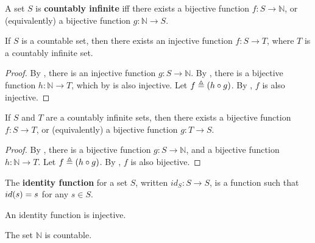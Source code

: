 \begin{definition} \label{def:countably-infinite} A set $S$ is
\textbf{countably infinite} iff there exists a bijective function $f : S
\rightarrow \mathbb{N}$, or (equivalently) a bijective function $g : \mathbb{N}
\rightarrow S$. \end{definition}

\begin{theorem} \label{thm:countable-to-countably-infinite} If $S$ is a
countable set, then there exists an injective function $f : S \rightarrow T$,
where $T$ is a countably infinite set.  \end{theorem}

\begin{proof} By , there is an injective function $g : S
\rightarrow \mathbb{N}$. By , there is a bijective
function $h : \mathbb{N} \rightarrow T$, which by  is also
injective. Let $f \triangleq {\ensuremath{\mathopen{}\left({h \circ g}\right)\mathclose{}}}$. By , $f$
is also injective. \end{proof}

\begin{theorem} \label{thm:countably-infinite-to-countably-infinite} If $S$ and
$T$ are a countably infinite sets, then there exists a bijective function $f :
S \rightarrow T$, or (equivalently) a bijective function $g : T \rightarrow S$.
\end{theorem}

\begin{proof} By , there is a bijective function $g
: S \rightarrow \mathbb{N}$, and a bijective function $h : \mathbb{N}
\rightarrow T$. Let $f \triangleq {\ensuremath{\mathopen{}\left({h \circ g}\right)\mathclose{}}}$. By
, $f$ is also bijective.\end{proof}

\begin{definition} \label{def:id-function} The \textbf{identity function} for a
set $S$, written $id_S : S\rightarrow S$, is a function such that $id{\mathopen{}\left({s}\right)\mathclose{}}=s$
for any $s\in S$. \end{definition}

\begin{corollary} An identity function is injective. \end{corollary}

\begin{corollary} The set $\mathbb{N}$ is countable. \end{corollary}

